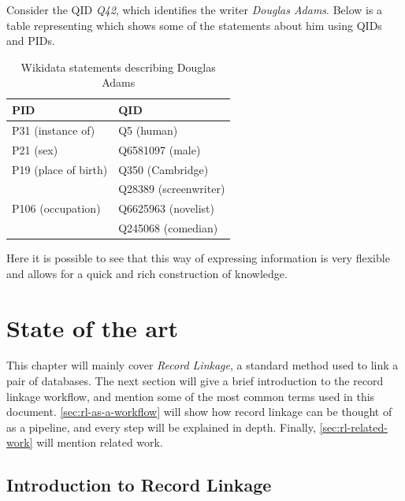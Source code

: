 \documentclass[epsfig,a4paper,11pt,titlepage,twoside,openany]{book}
\begin{document}
Consider the QID \textit{Q42}, which identifies the writer
\textit{Douglas Adams}. Below is a table representing which shows some of the statements about him
using QIDs and PIDs.

\begin{table}[H]
  \centering
  \begin{tabular}{l|l}
    PID                                & QID                   \\ \hline
    P31 (instance of)                  & Q5 (human)            \\ \hline
    P21 (sex)                          & Q6581097 (male)       \\ \hline
    P19 (place of birth)               & Q350 (Cambridge)      \\ \hline
    \multirow{3}{*}{P106 (occupation)} & Q28389 (screenwriter) \\ \cline{2-2} 
                                       & Q6625963 (novelist)   \\ \cline{2-2} 
                                       & Q245068 (comedian)   
  \end{tabular}
  \caption{Wikidata statements describing Douglas Adams}
  \label{tab:intro-wikidata-douglas42}
\end{table}

Here it is possible to see that this way of expressing information is very
flexible and allows for a quick and rich construction of knowledge. 






\chapter{State of the art}
\label{chap:state-of-the-art}

This chapter will mainly cover \textit{Record Linkage}, a standard method used to link a pair of databases. The next section will give a brief introduction to the record linkage workflow, and mention some of the most common terms used in this document. \autoref{sec:rl-as-a-workflow} will show how record linkage can be thought of as a pipeline, and every step will be explained in depth. Finally, \autoref{sec:rl-related-work} will mention related work.

\section{Introduction to Record Linkage}
\label{sec:rl-intro}
\end{document}
